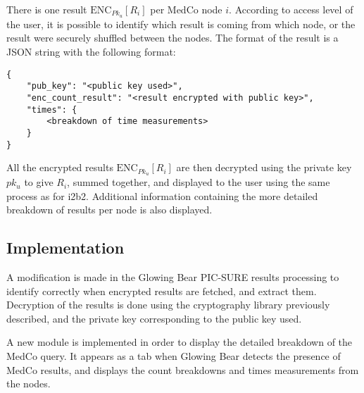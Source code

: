 There is one result $\text{ENC}_{Pk_u}[R_i]$ per MedCo node $i$.
According to access level of the user, it is possible to identify which result is coming from which node, or the result were securely shuffled between the nodes.
The format of the result is a JSON string with the following format:

\begin{samepage}
\begin{verbatim}
{
    "pub_key": "<public key used>",
    "enc_count_result": "<result encrypted with public key>",
    "times": {
        <breakdown of time measurements>
    }
}    
\end{verbatim}
\end{samepage}

All the encrypted results $\text{ENC}_{Pk_u}[R_i]$ are then decrypted using the private key $pk_u$ to give $R_i$, summed together, and displayed to the user using the same process as for i2b2.
Additional information containing the more detailed breakdown of results per node is also displayed.


\subsection{Implementation}

A modification is made in the Glowing Bear PIC-SURE results processing to identify correctly when encrypted results are fetched, and extract them.
Decryption of the results is done using the cryptography library previously described, and the private key corresponding to the public key used.

A new module is implemented in order to display the detailed breakdown of the MedCo query.
It appears as a tab when Glowing Bear detects the presence of MedCo results, and displays the count breakdowns and times measurements from the nodes.
